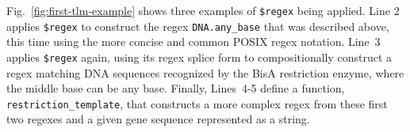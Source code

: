 \documentclass[acmsmall,screen]{acmart}
\newcommand{\li}[1]{\lstinline[basicstyle=\ttfamily\fontsize{9pt}{1em}\selectfont]{#1}}
\begin{document}
Fig.~\ref{fig:first-tlm-example} shows three examples of \li{$regex} being applied.
Line 2 applies \li{$regex} to construct the regex \li{DNA.any_base} that was  described above, this time using the more concise and common POSIX regex notation. Line~3 applies \li{$regex} again, using its regex splice form to compositionally construct a regex matching DNA sequences recognized by the BisA restriction enzyme, where the middle base can be any base. Finally, Lines~4-5 define a function, \li{restriction_template}, that constructs a more complex regex from these first two regexes and a given gene sequence represented as a string.




\end{document}
